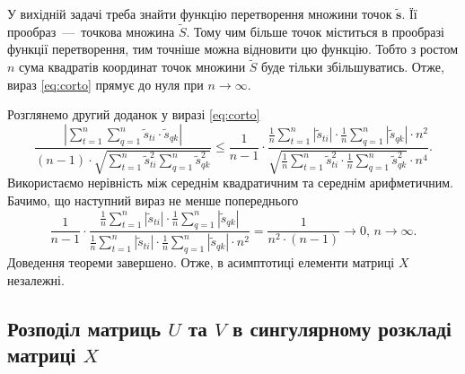 У вихідній задачі треба знайти функцію перетворення множини точок
$\tilde{\boldsymbol{s}}$.
Її прообраз~---~точкова множина $\tilde{S}$.
Тому чим більше точок міститься в прообразі функції перетворення,
тим точніше можна відновити цю функцію.
Тобто з ростом $n$ сума квадратів координат точок множини $\tilde{S}$
буде тільки збільшуватись.
Отже, вираз \eqref{eq:corto} прямує до нуля при $n \to \infty $.

Розглянемо другий доданок у виразі \eqref{eq:corto}
\begin{equation*}
  \frac{\left| \sum \limits_{t=1}^n \sum \limits_{q=1}^n \tilde{s}_{ti} \cdot \tilde{s}_{qk} \right|}{\left(n-1\right) \cdot \sqrt{\sum \limits_{t=1}^n \tilde{s}_{ti}^2 \sum \limits_{q=1}^n \tilde{s}_{qk}^2}} \leq
  \frac{1}{n-1}\cdot \frac{\frac{1}{n}\sum \limits_{t=1}^n \left|\tilde{s}_{ti} \right| \cdot \frac{1}{n} \sum \limits_{q=1}^n \left| \tilde{s}_{qk} \right| \cdot n^2}{\sqrt{\frac{1}{n}\sum \limits_{t=1}^n \tilde{s}_{ti}^2 \cdot \frac{1}{n}\sum \limits_{q=1}^n \tilde{s}_{qk}^2} \cdot n^4}.
\end{equation*}
Використаємо нерівність між середнім квадратичним та середнім арифметичним.
Бачимо, що наступний вираз не менше попереднього
\begin{equation*}
  \frac{1}{n - 1} \cdot \frac{\frac{1}{n} \sum \limits_{t=1}^n \left| \tilde{s}_{ti} \right| \cdot \frac{1}{n} \sum \limits_{q=1}^n \left| \tilde{s}_{qk} \right|}{\frac{1}{n} \sum \limits_{t=1}^n \left| \tilde{s}_{ti} \right| \cdot \frac{1}{n} \sum \limits_{q=1}^n \left| \tilde{s}_{qk} \right| \cdot n^2} =
  \frac{1}{n^2 \cdot \left( n-1 \right)} \to
  0, \, n \to \infty.
\end{equation*}
Доведення теореми завершено.
Отже, в асимптотиці елементи матриці $X$ незалежні.

\subsection{Розподіл матриць $U$ та $V$ в сингулярному розкладі матриці $X$}


